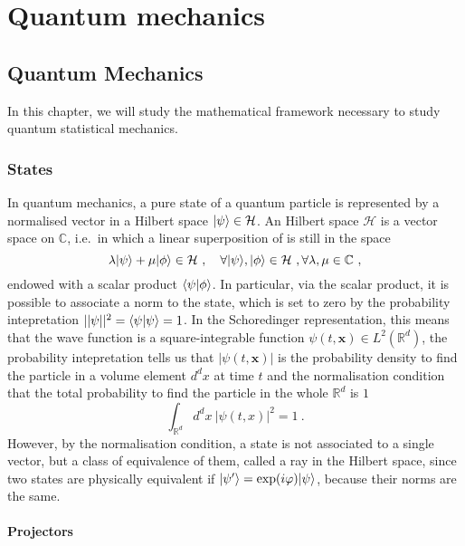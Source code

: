 \part{Quantum mechanics}

\chapter{Quantum Mechanics}

    In this chapter, we will study the mathematical framework necessary to study quantum statistical mechanics.

\section{States}

    In quantum mechanics, a pure state of a quantum particle is represented by a normalised vector in a Hilbert space $\vert\psi\rangle \in \mathcal H$. An Hilbert space $\mathcal H$ is a vector space on $\mathbb C$, i.e.~in which a linear superposition of is still in the space 
    \begin{equation*}
        \lambda \vert\psi\rangle + \mu \vert\phi\rangle \in \mathcal H ~, \quad \forall \vert\psi\rangle, \vert\phi\rangle \in \mathcal H ~, \forall \lambda, \mu \in \mathbb C ~, 
    \end{equation*}
    endowed with a scalar product $\langle\psi\vert\phi\rangle$. In particular, via the scalar product, it is possible to associate a norm to the state, which is set to zero by the probability intepretation $||\psi||^2 = \langle\psi\vert\psi\rangle = 1$. In the Schoredinger representation, this means that the wave function is a square-integrable function $\psi(t,\mathbf x) \in L^2(\mathbb R^d)$, the probability intepretation tells us that $|\psi(t, \mathbf x)|$ is the probability density to find the particle in a volume element $d^d x$ at time $t$ and the normalisation condition that the total probability to find the particle in the whole $\mathbb R^d$ is $1$ 
    \begin{equation*}
        \int_{\mathbb R^d} d^d x ~ |\psi(t,x)|^2 = 1 ~.
    \end{equation*}
    However, by the normalisation condition, a state is not associated to a single vector, but a class of equivalence of them, called a ray in the Hilbert space, since two states are physically equivalent if $\vert\psi'\rangle = \exp(i \varphi) \vert\psi\rangle$, because their norms are the same.

\subsection{Projectors}

